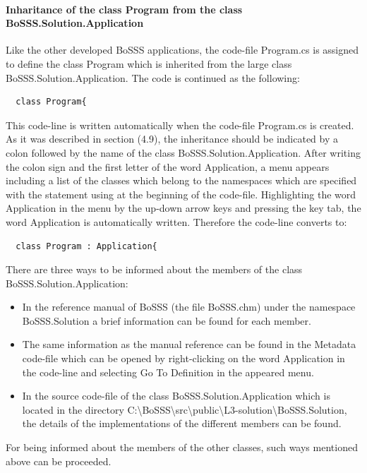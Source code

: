 \documentclass[11pt,twoside,a4paper]{fdyartcl}
\begin{document}
\paragraph{Inharitance of the class {\scriptsize Program} from the class {\scriptsize BoSSS.Solution.Application}} Like the other developed BoSSS applications, the code-file {\scriptsize Program.cs} is assigned to define the class {\scriptsize Program} which is inherited from the large class {\scriptsize BoSSS.Solution.Application}. The code is continued as the following:
{\scriptsize \begin{verbatim}
  class Program{
\end{verbatim}}
This code-line is written automatically when the code-file {\scriptsize Program.cs} is created. As it was described in section (4.9), the inheritance should be indicated by a colon followed by the name of the class {\scriptsize BoSSS.Solution.Application}. After writing the colon sign and the first letter of the word {\scriptsize Application}, a menu appears including a list of the classes which belong to the namespaces which are specified with the statement {\scriptsize using} at the beginning of the code-file. Highlighting the word {\scriptsize Application} in the menu by the up-down arrow keys and pressing the key tab, the word {\scriptsize Application} is automatically written. Therefore the code-line converts to:
{\scriptsize \begin{verbatim}
  class Program : Application{
\end{verbatim}}
There are three ways to be informed about the members of the class {\scriptsize BoSSS.Solution.Application}:
\begin{itemize}
\item In the reference manual of BoSSS (the file {\scriptsize BoSSS.chm}) under the namespace {\scriptsize BoSSS.Solution} a brief information can be found for each member.
\item The same information as the manual reference can be found in the Metadata code-file which can be opened by right-clicking on the word {\scriptsize Application} in the code-line and selecting {\scriptsize Go To Definition} in the appeared menu.
\item In the source code-file of the class {\scriptsize BoSSS.Solution.Application} which is located in the directory {\scriptsize C:\textbackslash BoSSS\textbackslash src\textbackslash public\textbackslash L3-solution\textbackslash BoSSS.Solution}, the details of the implementations of the different members can be found.
\end{itemize}
For being informed about the members of the other classes, such ways mentioned above can be proceeded.
\end{document}
